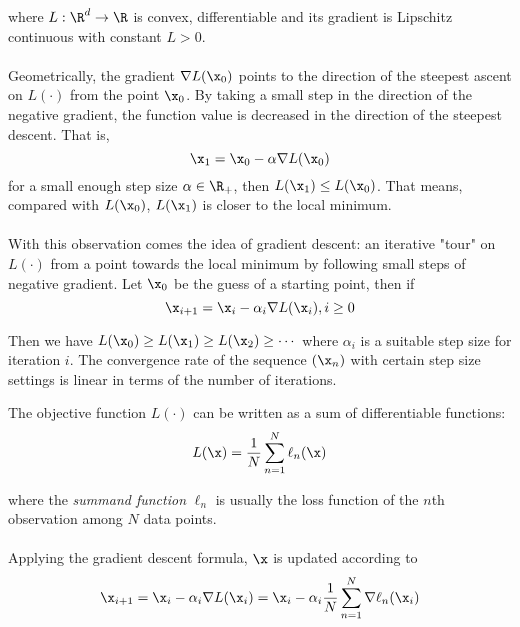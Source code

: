         where $L : \R^d \to \R$ is convex, differentiable and its gradient is Lipschitz continuous with constant
        $L > 0$.
        \\\\
        Geometrically, the gradient $\nabla L(\x_0)$ points to the direction of the steepest ascent on $L(\cdot)$ 
        from the point $\x_0$. 
        By taking a small step in the direction of the negative gradient, the function value is decreased in the 
        direction of the steepest descent. That is,
        \begin{equation}
            \x_1  = \x_0 - \alpha \nabla L(\x_0)
        \end{equation}
        for a small enough step size $\alpha \in \R_{+}$, then $L(\x_1) \leq L(\x_0)$. 
        That means, compared with $L(\x_0)$, $L(\x_1)$ is closer to the local minimum.
        \\\\
        With this observation comes the idea of gradient descent: an iterative "tour" on $L(\cdot)$ from a point towards the 
        local minimum by following small steps of negative gradient. 
        Let $\x_0$ be the guess of a starting point, then if
        \begin{equation}
            \x_{i+1} = \x_{i} - \alpha_i \nabla L(\x_i), i \geq 0
        \end{equation}
        
        
        Then we have $ L(\x_0) \geq L(\x_1) \geq L(\x_2) \geq \cdots$ where $\alpha_i$ is a suitable step size for iteration $i$. The convergence rate of the 
        sequence $(\x_n)$ with certain step size settings is linear in terms of the number of iterations.

        The objective function $L(\cdot)$ can be written as a sum of differentiable functions:%
        \begin{equation}
            L(\x) =\frac{1}{N} \sum_{n=1}^{N} \ell_n (\x)
        \end{equation}

        where the \textit{summand function} $\ell_n$ is usually the loss function of the $n$th observation among
        $N$ data points.
        \\\\
        Applying the gradient descent formula, $\x$ is updated according to%
        \begin{equation}
           \x_{i+1} = \x_{i} -\alpha_i \nabla L(\x_i) = \x_{i} -\alpha_i \frac{1}{N}\sum_{n=1}^{N} \nabla \ell_n(\x_i) 
           \label{eq: background_gd_summand}
        \end{equation}

